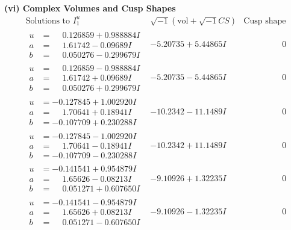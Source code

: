 \documentclass[1p]{elsarticle_modified}
\theoremstyle{definition}
\newcommand{\I}{\sqrt{-1}}
\begin{document}
\newpage\flushleft \textbf{(vi) Complex Volumes and Cusp Shapes}
$$\begin{array}{c|c|c}  
\text{Solutions to }I^u_{1}& \I (\text{vol} + \sqrt{-1}CS) & \text{Cusp shape}\\
 \hline 
\begin{aligned}
u &= \phantom{-}0.126859 + 0.988884 I \\
a &= \phantom{-}1.61742 - 0.09689 I \\
b &= \phantom{-}0.050276 - 0.299679 I\end{aligned}
 & -5.20735 + 5.44865 I & \phantom{-0.000000 } 0 \\ \hline\begin{aligned}
u &= \phantom{-}0.126859 - 0.988884 I \\
a &= \phantom{-}1.61742 + 0.09689 I \\
b &= \phantom{-}0.050276 + 0.299679 I\end{aligned}
 & -5.20735 - 5.44865 I & \phantom{-0.000000 } 0 \\ \hline\begin{aligned}
u &= -0.127845 + 1.002920 I \\
a &= \phantom{-}1.70641 + 0.18941 I \\
b &= -0.107709 + 0.230288 I\end{aligned}
 & -10.2342 - 11.1489 I & \phantom{-0.000000 } 0 \\ \hline\begin{aligned}
u &= -0.127845 - 1.002920 I \\
a &= \phantom{-}1.70641 - 0.18941 I \\
b &= -0.107709 - 0.230288 I\end{aligned}
 & -10.2342 + 11.1489 I & \phantom{-0.000000 } 0 \\ \hline\begin{aligned}
u &= -0.141541 + 0.954879 I \\
a &= \phantom{-}1.65626 - 0.08213 I \\
b &= \phantom{-}0.051271 + 0.607650 I\end{aligned}
 & -9.10926 + 1.32235 I & \phantom{-0.000000 } 0 \\ \hline\begin{aligned}
u &= -0.141541 - 0.954879 I \\
a &= \phantom{-}1.65626 + 0.08213 I \\
b &= \phantom{-}0.051271 - 0.607650 I\end{aligned}
 & -9.10926 - 1.32235 I & \phantom{-0.000000 } 0 \\ \hline\begin{aligned}

\end{aligned}
\end{array}$$
\end{document}
